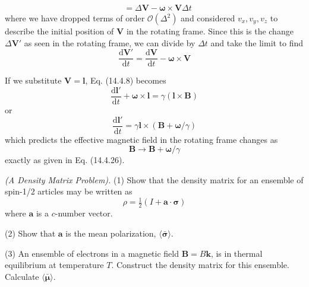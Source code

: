 \documentclass[../principles-of-quantum-mechanics.tex]{subfiles}
\begin{document}
\begin{questions}
\begin{solution}
\begin{align*}
				&= \Delta\mathbf{V} - \boldsymbol{\omega} \times \mathbf{V}\Delta t
			\end{align*}
			where we have dropped terms of order $\mathcal{O}(\Delta^2)$ and considered $v_x, v_y, v_z$ to describe the initial position of $\mathbf{V}$ in the rotating frame. Since this is the change $\Delta\mathbf{V}'$ as seen in the rotating frame, we can divide by $\Delta t$ and take the limit to find
			$$\frac{\mathrm{d}\mathbf{V}'}{\mathrm{d}t} = \frac{\mathrm{d}\mathbf{V}}{\mathrm{d}t} - \boldsymbol{\omega}\times\mathbf{V}$$
			
			If we substitute $\mathbf{V} = \mathbf{l}$, Eq. (14.4.8) becomes
			$$\frac{\mathrm{d}\mathbf{l}'}{\mathrm{d}t} + \boldsymbol{\omega}\times\mathbf{l} = \gamma(\mathbf{l}\times\mathbf{B})$$
			or
			$$\frac{\mathrm{d}\mathbf{l}'}{\mathrm{d}t} = \gamma\mathbf{l}\times(\mathbf{B} + \boldsymbol{\omega}/\gamma)$$
			which predicts the effective magnetic field in the rotating frame changes as
			$$\mathbf{B} \to \mathbf{B} + \boldsymbol{\omega}/\gamma$$
			exactly as given in Eq. (14.4.26).
		\end{solution}
		
		\question \textit{(A Density Matrix Problem).} (1) Show that the density matrix for an ensemble of spin-1/2 articles may be written as
		$$\rho = \tfrac{1}{2}(I + \mathbf{a}\cdot\boldsymbol{\sigma})$$
		where $\mathbf{a}$ is a $c$-number vector.
		
		(2) Show that $\mathbf{a}$ is the mean polarization, $\langle \bar{\boldsymbol{\sigma}}\rangle$.
		
		(3) An ensemble of electrons in a magnetic field $\mathbf{B} = B\mathbf{k}$, is in thermal equilibrium at temperature $T$. Construct the density matrix for this ensemble. Calculate $\langle \bar{\boldsymbol{\mu}}\rangle$.
		

\end{questions}
\end{document}

